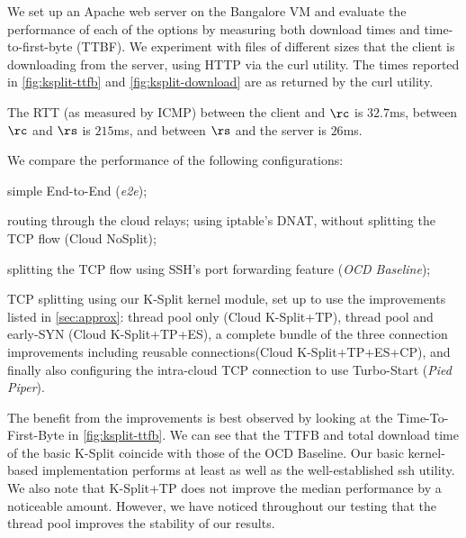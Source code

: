 \documentclass[newfonts=false,format=sigconf,anonymous,10pt,letterpaper]{acmart}
\newcommand{\name}{Pied Piper\xspace}
\newcommand{\ksplit}{K-Split\xspace}
\newcommand{\reconn}{reusable connections\xspace}
\begin{document}
We set up an Apache web server on the Bangalore VM and evaluate the performance of each of the options by measuring both download times and time-to-first-byte (TTBF). We experiment with files of different sizes that the client is downloading from the server, using HTTP via the curl utility. The times reported in \autoref{fig:ksplit-ttfb} and \autoref{fig:ksplit-download}  are as returned by the curl utility. 

The RTT  (as measured by ICMP) between the client and $\rc$ is $32.7$ms, between $\rc$ and $\rs$ is $215$ms, and between $\rs$ and the server is $26$ms.

We compare the performance of the following configurations: \begin{romanlist}
     \item simple End-to-End (\textit{e2e});
     \item routing through the cloud relays; using iptable's DNAT, without splitting the TCP flow (Cloud NoSplit);
     \item splitting the TCP flow using SSH's port forwarding feature (\textit{OCD Baseline});
     \item TCP splitting using our \ksplit kernel module, set up to use the improvements listed in \autoref{sec:approx}: thread pool only (Cloud \ksplit+TP), thread pool and early-SYN (Cloud \ksplit+TP+ES), a complete bundle of the three connection improvements including \reconn (Cloud \ksplit+TP+ES+CP), and finally also configuring the intra-cloud TCP connection to use Turbo-Start (\textit{\name}).
\end{romanlist}

The benefit from the improvements is best observed by looking at the Time-To-First-Byte in \autoref{fig:ksplit-ttfb}. We can see that the  TTFB and total download time of the basic \ksplit coincide with those of the OCD Baseline. Our basic kernel-based implementation performs at least as well as the well-established ssh utility. We also note that \ksplit+TP does not improve the median performance by a noticeable amount. However, we have noticed throughout our testing that the thread pool improves the stability of our results.
\end{document}
